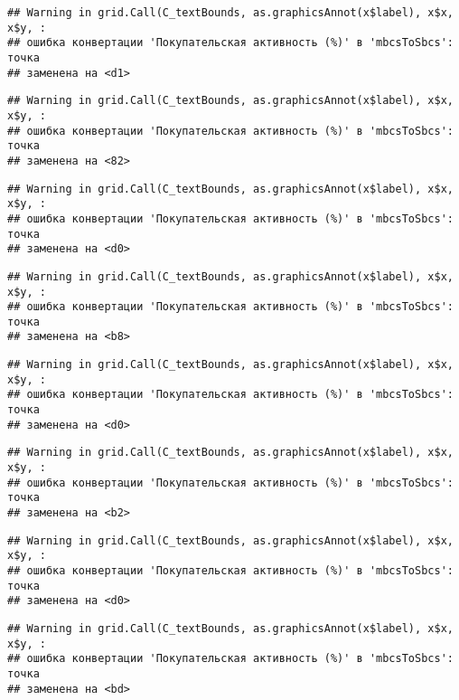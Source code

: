 \documentclass[
]{article}
\begin{document}
\begin{verbatim}
## Warning in grid.Call(C_textBounds, as.graphicsAnnot(x$label), x$x, x$y, :
## ошибка конвертации 'Покупательская активность (%)' в 'mbcsToSbcs': точка
## заменена на <d1>
\end{verbatim}

\begin{verbatim}
## Warning in grid.Call(C_textBounds, as.graphicsAnnot(x$label), x$x, x$y, :
## ошибка конвертации 'Покупательская активность (%)' в 'mbcsToSbcs': точка
## заменена на <82>
\end{verbatim}

\begin{verbatim}
## Warning in grid.Call(C_textBounds, as.graphicsAnnot(x$label), x$x, x$y, :
## ошибка конвертации 'Покупательская активность (%)' в 'mbcsToSbcs': точка
## заменена на <d0>
\end{verbatim}

\begin{verbatim}
## Warning in grid.Call(C_textBounds, as.graphicsAnnot(x$label), x$x, x$y, :
## ошибка конвертации 'Покупательская активность (%)' в 'mbcsToSbcs': точка
## заменена на <b8>
\end{verbatim}

\begin{verbatim}
## Warning in grid.Call(C_textBounds, as.graphicsAnnot(x$label), x$x, x$y, :
## ошибка конвертации 'Покупательская активность (%)' в 'mbcsToSbcs': точка
## заменена на <d0>
\end{verbatim}

\begin{verbatim}
## Warning in grid.Call(C_textBounds, as.graphicsAnnot(x$label), x$x, x$y, :
## ошибка конвертации 'Покупательская активность (%)' в 'mbcsToSbcs': точка
## заменена на <b2>
\end{verbatim}

\begin{verbatim}
## Warning in grid.Call(C_textBounds, as.graphicsAnnot(x$label), x$x, x$y, :
## ошибка конвертации 'Покупательская активность (%)' в 'mbcsToSbcs': точка
## заменена на <d0>
\end{verbatim}

\begin{verbatim}
## Warning in grid.Call(C_textBounds, as.graphicsAnnot(x$label), x$x, x$y, :
## ошибка конвертации 'Покупательская активность (%)' в 'mbcsToSbcs': точка
## заменена на <bd>
\end{verbatim}
\end{document}
